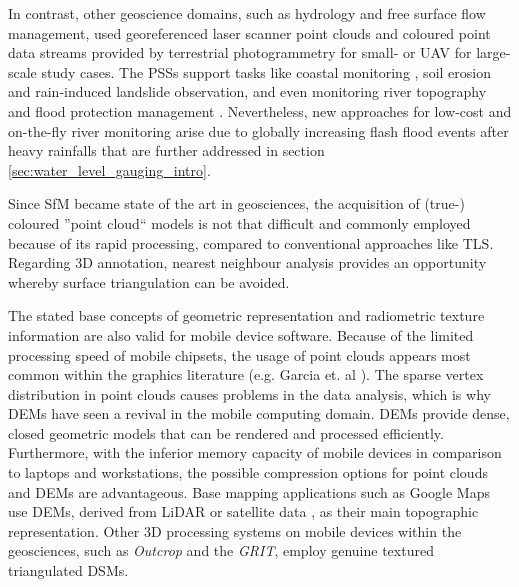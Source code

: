 \documentclass[review]{elsarticle}
\begin{document}
In contrast, other geoscience domains, such as hydrology and free surface flow management, used georeferenced laser scanner point clouds and coloured point data streams provided by terrestrial photogrammetry for small- or \gls{UAV} for large-scale study cases. The \glspl{PSS} support tasks like coastal monitoring \cite{Letortu2017, Medjkane2018}, soil erosion and rain-induced landslide observation, and even monitoring river topography \cite{Watanabe2016} and flood protection management \cite{Leskens2015}. Nevertheless, new approaches for low-cost and on-the-fly river monitoring \cite{Kroehnert2017a} arise due to globally increasing flash flood events after heavy rainfalls \cite{Mueller2011} that are further addressed in section \ref{sec:water_level_gauging_intro}.
 
Since \gls{SfM} became state of the art in geosciences, the acquisition of (true-) coloured ''point cloud`` models is not that difficult and commonly employed because of its rapid processing, compared to conventional approaches like \gls{TLS}. Regarding 3D annotation, nearest neighbour analysis provides an opportunity whereby surface triangulation can be avoided.


The stated base concepts of geometric representation and radiometric texture information are also valid for mobile device software. Because of the limited processing speed of mobile chipsets, the usage of point clouds appears most common within the graphics literature (e.g. Garcia et. al \cite{Garcia2015}). The sparse vertex distribution in point clouds causes problems in the data analysis, which is why \glspl{DEM} have seen a revival in the mobile computing domain. \Glspl{DEM} provide dense, closed geometric models that can be rendered and processed efficiently. Furthermore, with the inferior memory capacity of mobile devices in comparison to laptops and workstations, the possible compression options for point clouds and \glspl{DEM} are advantageous. Base mapping applications such as Google Maps use \glspl{DEM}, derived from \gls{LiDAR} or satellite data \cite{Farr2007}, as their main topographic representation. Other 3D processing systems on mobile devices within the geosciences, such as \textit{Outcrop} and the \textit{\gls{GRIT}}, employ genuine textured triangulated \glspl{DSM}.%
\end{document}
